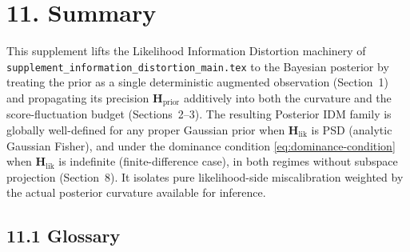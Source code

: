 \documentclass[11pt]{article}
\begin{document}
\section*{11. Summary}

This supplement lifts the Likelihood Information Distortion machinery of \texttt{supplement\_information\_distortion\_main.tex} to the Bayesian posterior by treating the prior as a single deterministic augmented observation (Section~1) and propagating its precision $\mathbf H_{\mathrm{prior}}$ additively into both the curvature and the score-fluctuation budget (Sections~2--3). The resulting Posterior IDM family is globally well-defined for any proper Gaussian prior when $\mathbf H_{\mathrm{lik}}$ is PSD (analytic Gaussian Fisher), and under the dominance condition \eqref{eq:dominance-condition} when $\mathbf H_{\mathrm{lik}}$ is indefinite (finite-difference case), in both regimes without subspace projection (Section~8). It isolates pure likelihood-side miscalibration weighted by the actual posterior curvature available for inference.

\subsection*{11.1 Glossary}
\end{document}
